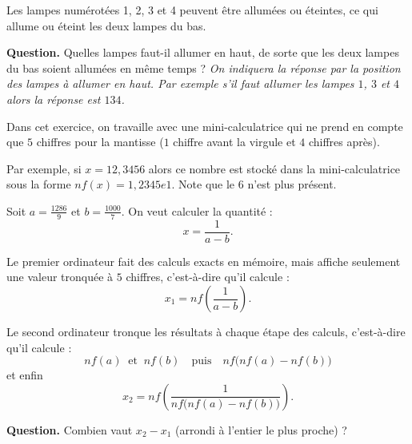 \documentclass[class=report,crop=false, 12pt]{standalone}
\begin{document}


\begin{enigme}

Les lampes numérotées 1, 2, 3 et 4 peuvent être allumées ou éteintes, ce qui allume ou éteint les deux lampes du bas.

 
\bigskip

\textbf{Question.} Quelles lampes faut-il allumer en haut, de sorte que les deux lampes du bas soient allumées en même temps ?
\emph{On indiquera la réponse par la position des lampes à allumer en haut. Par exemple s'il faut allumer les lampes $1$, $3$ et $4$ alors la réponse est $134$.}


\end{enigme}


\begin{enigme}

Dans cet exercice, on travaille avec une mini-calculatrice qui ne prend en compte que $5$ chiffres pour la mantisse ($1$ chiffre avant la virgule et $4$ chiffres après).  

Par exemple, si $x = 12,3456$ alors ce nombre est stocké dans la mini-calculatrice sous la forme $nf(x) = 1,2345e1$. Note que le $6$ n'est plus présent.
 
\bigskip

Soit $a = \frac{1286}{9}$ et $b = \frac{1000}{7}$.
On veut calculer la quantité :
$$x = \frac{1}{a-b}.$$

Le premier ordinateur fait des calculs exacts en mémoire, mais affiche seulement une valeur tronquée à $5$ chiffres, c'est-à-dire qu'il calcule :
$$x_1 = nf\left( \frac{1}{a-b} \right).$$

Le second ordinateur tronque les résultats à chaque étape des calculs, c'est-à-dire qu'il calcule :
$$nf(a) \  \text{ et } \  nf(b) \quad \text{puis} \quad 
nf\big( nf(a) - nf(b) \big)$$
et enfin 
$$x_2 = nf \left( \frac{1}{nf\big( nf(a) - nf(b) \big)}\right).$$


\textbf{Question.} Combien vaut $x_2-x_1$ (arrondi à l'entier le plus proche) ?

%
%

\end{enigme}
\end{document}
